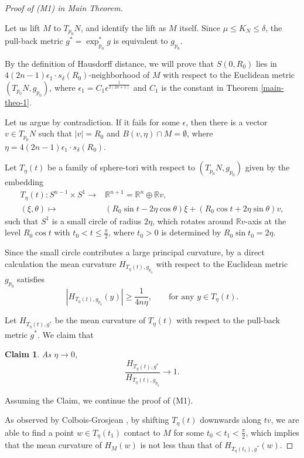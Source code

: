 \documentclass{amsart}
\numberwithin{equation}{section}
\newtheorem{claim}[theo]{Claim}
\theoremstyle{remark}
\renewcommand{\(}{\left(}
\renewcommand{\)}{\right)}
\renewcommand{\~}{\tilde}
\renewcommand{\-}{\overline}
\renewcommand{\d}{\delta}
\newcommand{\e}{\epsilon}
\begin{document}
\begin{proof}[Proof of (M1) in Main Theorem]
	~
	
	Let us lift $M$ to $T_{p_0}N$, and identify the lift as $M$ itself. Since $\mu \le K_N\le \d$, the pull-back metric $g^*=\exp_{p_0}^*g$ is equivalent to $g_{p_0}$.
	
	By the definition of Hausdorff distance, we will prove that
	$S(0,R_0)$ lies in
	$4(2n-1)\e_1\cdot s_\d(R_0)$-neighborhood of $M$ with respect to the Euclidean metric $(T_{p_0}N,g_{p_0})$, where $\e_1=C_1\e^\frac{1}{2(2n+1)}$ and $C_1$ is the constant in Theorem \ref{main-theo-1}.
	
	Let us argue by contradiction. If it fails for some $\e$, then there is a vector $v \in T_{p_0}N$ such that $|v|=R_0$ and $B(v,\eta)\cap M=\emptyset$, where $\eta=4(2n-1)\e_1\cdot s_\d(R_0)$.

	 Let $T_\eta(t)$ be a family of sphere-tori with respect to $(T_{p_0}N,g_{p_0})$ given by the embedding
	\begin{align*}
	T_\eta(t): S^{n-1}\times S^{1} \to & \mathbb R^{n+1}=\mathbb R^n\oplus \mathbb R v,\\
                 (\xi,\theta)\mapsto &  (R_0 \sin t-2\eta \cos \theta) \xi + (R_0\cos t+2\eta \sin \theta)v,
	\end{align*}
	such that $S^1$ is a small circle of radius $2\eta$, which rotates around $\mathbb R v$-axis at the level $R_0\cos t$ with $t_0< t\le \frac{\pi}{2}$, where $t_0>0$ is determined by $R_0\sin t_0=2\eta$.
	
	Since the small circle contributes a large principal curvature, by a direct calculation the mean curvature $H_{T_\eta(t),g_{p_0}}$ with respect to the Euclidean metric $g_{p_0}$ satisfies
	$$|H_{T_\eta(t),g_{p_0}}(y)|\ge \frac{1}{4n\eta}, \qquad \text{for any $y\in T_\eta(t)$}.$$
	
	Let $H_{T_\eta(t),g^*}$ be the mean curvature of $T_\eta(t)$ with respect to the pull-back metric $g^*$.
	We claim that
	\begin{claim}\label{claim-hausclose}
		As $\eta\to 0$,
		$$\frac{H_{T_\eta(t),g^*}}{H_{T_\eta(t),g_{p_0}}}\to 1.$$
	\end{claim}

	Assuming the Claim, we continue the proof of (M1).
	
	As observed by Colbois-Grosjean \cite{Colbois-Grosjean2007}, by shifting $T_\eta(t)$ downwards along $tv$, we are able to find a point $w\in T_\eta(t_1)$ contact to $M$ for some $t_0< t_1< \frac{\pi}{2}$, which implies that the mean curvature of $H_M(w)$ is not less than that of $H_{T_\eta(t_1),g^*}(w)$.
	

\end{proof}
\end{document}
